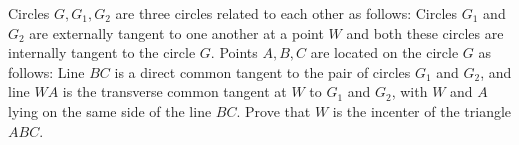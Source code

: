 Circles $G, G_1, G_2$ are three circles related to each other as follows: Circles $G_1$ and $G_2$ are externally tangent to one another at a point $W$ and both these circles are internally tangent to the circle $G$. Points $A, B, C$ are located on the circle $G$ as follows: Line $BC$ is a direct common tangent to the pair of circles $G_1$ and $G_2$, and line $WA$ is the transverse common tangent at $W$ to $G_1$ and $G_2$, with $W$ and $A$ lying on the same side of the line $BC$. Prove that $W$ is the incenter of the triangle $ABC$.
